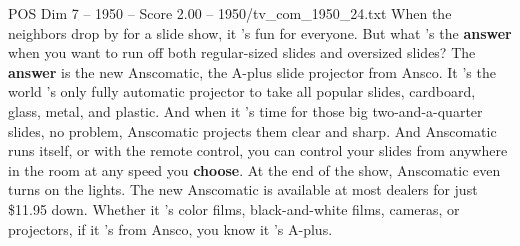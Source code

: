 \begin{textsample}{POS Dim 7 – 1950 – Score 2.00 – 1950/tv\_com\_1950\_24.txt}  \label{ex:f7_pos_012}
When the neighbors drop by for a slide show, it 's fun for everyone.
But what 's the \textbf{answer} when you want to run off both regular-sized slides and oversized slides?
The \textbf{answer} is the new Anscomatic, the A-plus slide projector from Ansco.
It 's the world 's only fully automatic projector to take all popular slides, cardboard, glass, metal, and plastic.
And when it 's time for those big two-and-a-quarter slides, no problem, Anscomatic projects them clear and sharp.
And Anscomatic runs itself, or with the remote control, you can control your slides from anywhere in the room at any speed you \textbf{choose}.
At the end of the show, Anscomatic even turns on the lights.
The new Anscomatic is available at most dealers for just \$11.95 down.
Whether it 's color films, black-and-white films, cameras, or projectors, if it 's from Ansco, you know it 's A-plus.

\end{textsample}
